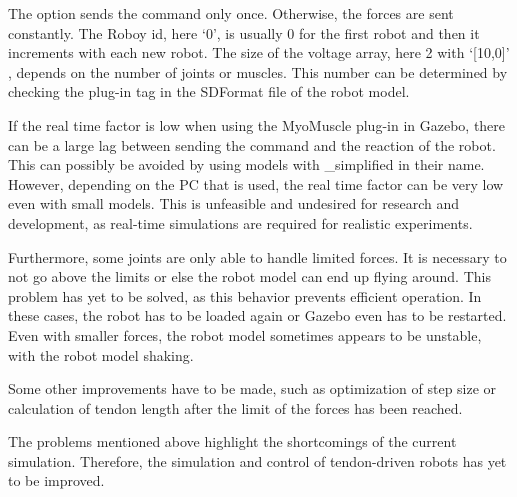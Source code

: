 The option  sends the command only once. Otherwise, the forces are sent constantly. The Roboy id, here ‘0’, is usually 0 for the first robot and then it increments with each new robot. The size of the voltage array, here 2 with ‘[10,0]’ , depends on the number of joints or muscles. This number can be determined by checking the plug-in tag in the SDFormat file of the robot model.%

If the real time factor is low when using the MyoMuscle plug-in in Gazebo, there can be a large lag between sending the command and the reaction of the robot. This can possibly be avoided by using models with \_simplified in their name. However, depending on the PC that is used, the real time factor can be very low even with small models. This is unfeasible and undesired for research and development, as real-time simulations are required for realistic experiments.

Furthermore, some joints  are only able to handle limited forces. It is necessary to not go above the limits or else the robot model can end up flying around. This problem has yet to be solved, as this behavior prevents efficient operation. In these cases, the robot has to be loaded again or Gazebo even  has to be restarted. Even with smaller forces, the robot model sometimes appears to be unstable, with the robot model shaking.

Some other improvements have to be made, such as optimization of step size or calculation of tendon length after the limit of the forces has been reached\cite{BA}.

The problems mentioned above highlight the shortcomings of the current simulation. Therefore, the simulation and control of tendon-driven robots has yet to be improved.